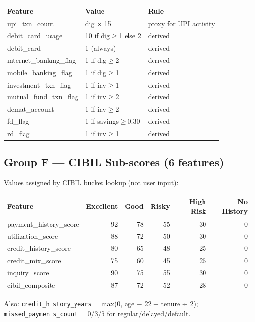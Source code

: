 \documentclass[12pt,a4paper]{article}
\begin{document}
\begin{tabular}{lll}
\toprule
\textbf{Feature} & \textbf{Value} & \textbf{Rule} \\
\midrule
upi\_txn\_count & dig $\times$ 15 & proxy for UPI activity \\
debit\_card\_usage & 10 if dig$\geq$1 else 2 & derived \\
debit\_card & 1 (always) & derived \\
internet\_banking\_flag & 1 if dig$\geq$2 & derived \\
mobile\_banking\_flag & 1 if dig$\geq$1 & derived \\
investment\_txn\_flag & 1 if inv$\geq$1 & derived \\
mutual\_fund\_txn\_flag & 1 if inv$\geq$2 & derived \\
demat\_account & 1 if inv$\geq$2 & derived \\
fd\_flag & 1 if savings$\geq$0.30 & derived \\
rd\_flag & 1 if inv$\geq$1 & derived \\
\bottomrule
\end{tabular}

\subsection{Group F — CIBIL Sub-scores (6 features)}

Values assigned by CIBIL bucket lookup (not user input):

\begin{tabular}{lrrrrr}
\toprule
\textbf{Feature} & \textbf{Excellent} & \textbf{Good} & \textbf{Risky} & \textbf{High Risk} & \textbf{No History} \\
\midrule
payment\_history\_score & 92 & 78 & 55 & 30 & 0 \\
utilization\_score      & 88 & 72 & 50 & 30 & 0 \\
credit\_history\_score  & 80 & 65 & 48 & 25 & 0 \\
credit\_mix\_score      & 75 & 60 & 45 & 25 & 0 \\
inquiry\_score          & 90 & 75 & 55 & 30 & 0 \\
cibil\_composite        & 87 & 72 & 52 & 28 & 0 \\
\bottomrule
\end{tabular}

Also: \texttt{credit\_history\_years} = max(0, age $-$ 22 + tenure $\div$ 2); \texttt{missed\_payments\_count} = 0/3/6 for regular/delayed/default.
\end{document}
